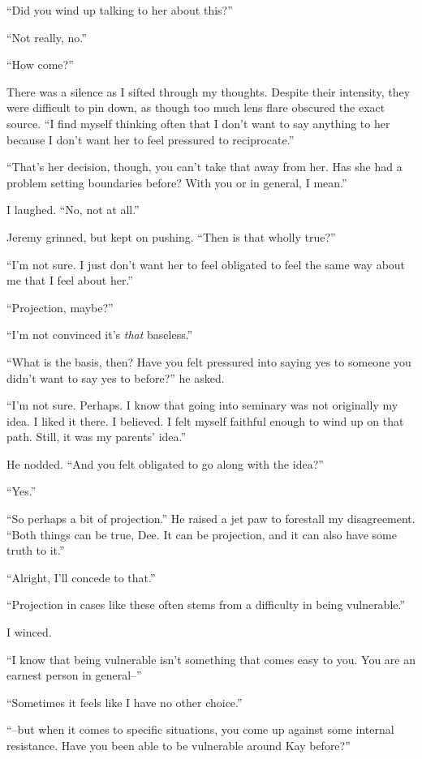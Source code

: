``Did you wind up talking to her about this?''

``Not really, no.''

``How come?''

There was a silence as I sifted through my thoughts. Despite their intensity, they were difficult to pin down, as though too much lens flare obscured the exact source. ``I find myself thinking often that I don't want to say anything to her because I don't want her to feel pressured to reciprocate.''

``That's her decision, though, you can't take that away from her. Has she had a problem setting boundaries before? With you or in general, I mean.''

I laughed. ``No, not at all.''

Jeremy grinned, but kept on pushing. ``Then is that wholly true?''

``I'm not sure. I just don't want her to feel obligated to feel the same way about me that I feel about her.''

``Projection, maybe?''

``I'm not convinced it's \emph{that} baseless.''

``What is the basis, then? Have you felt pressured into saying yes to someone you didn't want to say yes to before?'' he asked.

``I'm not sure. Perhaps. I know that going into seminary was not originally my idea. I liked it there. I believed. I felt myself faithful enough to wind up on that path. Still, it was my parents' idea.''

He nodded. ``And you felt obligated to go along with the idea?''

``Yes.''

``So perhaps a bit of projection.'' He raised a jet paw to forestall my disagreement. ``Both things can be true, Dee. It can be projection, and it can also have some truth to it.''

``Alright, I'll concede to that.''

``Projection in cases like these often stems from a difficulty in being vulnerable.''

I winced.

``I know that being vulnerable isn't something that comes easy to you. You are an earnest person in general--''

``Sometimes it feels like I have no other choice.''

``--but when it comes to specific situations, you come up against some internal resistance. Have you been able to be vulnerable around Kay before?''

